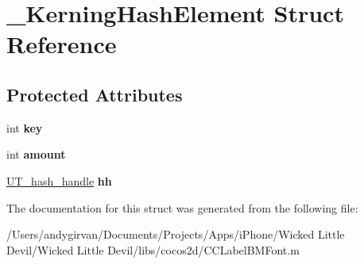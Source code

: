 \hypertarget{struct___kerning_hash_element}{\section{\-\_\-\-Kerning\-Hash\-Element Struct Reference}
\label{struct___kerning_hash_element}
}
\subsection*{Protected Attributes}
\begin{DoxyCompactItemize}
\item 
\hypertarget{struct___kerning_hash_element_a3d5a9cd723f885a8d24b75bb0289ce1d}{int {\bfseries key}}\label{struct___kerning_hash_element_a3d5a9cd723f885a8d24b75bb0289ce1d}

\item 
\hypertarget{struct___kerning_hash_element_a51a9c100050c2ab56431798e59509100}{int {\bfseries amount}}\label{struct___kerning_hash_element_a51a9c100050c2ab56431798e59509100}

\item 
\hypertarget{struct___kerning_hash_element_a1438adce8be9c5fde6f185595d3af254}{\hyperlink{struct_u_t__hash__handle}{U\-T\-\_\-hash\-\_\-handle} {\bfseries hh}}\label{struct___kerning_hash_element_a1438adce8be9c5fde6f185595d3af254}

\end{DoxyCompactItemize}


The documentation for this struct was generated from the following file\-:\begin{DoxyCompactItemize}
\item 
/\-Users/andygirvan/\-Documents/\-Projects/\-Apps/i\-Phone/\-Wicked Little Devil/\-Wicked Little Devil/libs/cocos2d/C\-C\-Label\-B\-M\-Font.\-m\end{DoxyCompactItemize}
